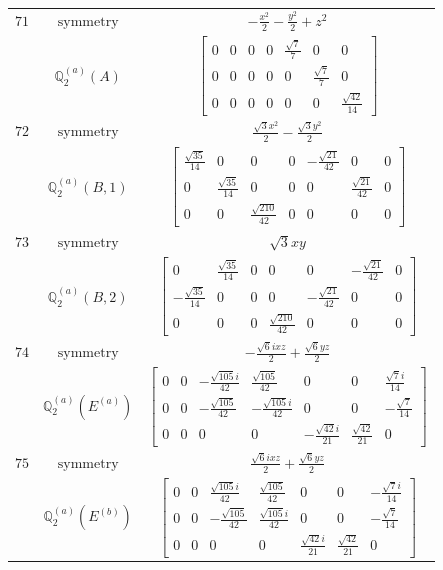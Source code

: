 \documentclass[fleqn,8pt,landscape]{jsarticle}
\begin{document}
\begin{longtable}{ccc}
$ 71 $ & $ \text{symmetry} $ & $ - \frac{x^{2}}{2} - \frac{y^{2}}{2} + z^{2} $ \\
$  $ & $ \mathbb{Q}_{2}^{(a)}(A) $ & $ \begin{bmatrix} 0 & 0 & 0 & 0 & \frac{\sqrt{7}}{7} & 0 & 0 \\ 0 & 0 & 0 & 0 & 0 & \frac{\sqrt{7}}{7} & 0 \\ 0 & 0 & 0 & 0 & 0 & 0 & \frac{\sqrt{42}}{14} \end{bmatrix} $ \\ \hline
$ 72 $ & $ \text{symmetry} $ & $ \frac{\sqrt{3} x^{2}}{2} - \frac{\sqrt{3} y^{2}}{2} $ \\
$  $ & $ \mathbb{Q}_{2}^{(a)}(B,1) $ & $ \begin{bmatrix} \frac{\sqrt{35}}{14} & 0 & 0 & 0 & - \frac{\sqrt{21}}{42} & 0 & 0 \\ 0 & \frac{\sqrt{35}}{14} & 0 & 0 & 0 & \frac{\sqrt{21}}{42} & 0 \\ 0 & 0 & \frac{\sqrt{210}}{42} & 0 & 0 & 0 & 0 \end{bmatrix} $ \\ \hline
$ 73 $ & $ \text{symmetry} $ & $ \sqrt{3} x y $ \\
$  $ & $ \mathbb{Q}_{2}^{(a)}(B,2) $ & $ \begin{bmatrix} 0 & \frac{\sqrt{35}}{14} & 0 & 0 & 0 & - \frac{\sqrt{21}}{42} & 0 \\ - \frac{\sqrt{35}}{14} & 0 & 0 & 0 & - \frac{\sqrt{21}}{42} & 0 & 0 \\ 0 & 0 & 0 & \frac{\sqrt{210}}{42} & 0 & 0 & 0 \end{bmatrix} $ \\ \hline
$ 74 $ & $ \text{symmetry} $ & $ - \frac{\sqrt{6} i x z}{2} + \frac{\sqrt{6} y z}{2} $ \\
$  $ & $ \mathbb{Q}_{2}^{(a)}(E^{(a)}) $ & $ \begin{bmatrix} 0 & 0 & - \frac{\sqrt{105} i}{42} & \frac{\sqrt{105}}{42} & 0 & 0 & \frac{\sqrt{7} i}{14} \\ 0 & 0 & - \frac{\sqrt{105}}{42} & - \frac{\sqrt{105} i}{42} & 0 & 0 & - \frac{\sqrt{7}}{14} \\ 0 & 0 & 0 & 0 & - \frac{\sqrt{42} i}{21} & \frac{\sqrt{42}}{21} & 0 \end{bmatrix} $ \\ \hline
$ 75 $ & $ \text{symmetry} $ & $ \frac{\sqrt{6} i x z}{2} + \frac{\sqrt{6} y z}{2} $ \\
$  $ & $ \mathbb{Q}_{2}^{(a)}(E^{(b)}) $ & $ \begin{bmatrix} 0 & 0 & \frac{\sqrt{105} i}{42} & \frac{\sqrt{105}}{42} & 0 & 0 & - \frac{\sqrt{7} i}{14} \\ 0 & 0 & - \frac{\sqrt{105}}{42} & \frac{\sqrt{105} i}{42} & 0 & 0 & - \frac{\sqrt{7}}{14} \\ 0 & 0 & 0 & 0 & \frac{\sqrt{42} i}{21} & \frac{\sqrt{42}}{21} & 0 \end{bmatrix} $ \\ \hline

\end{longtable}
\end{document}
